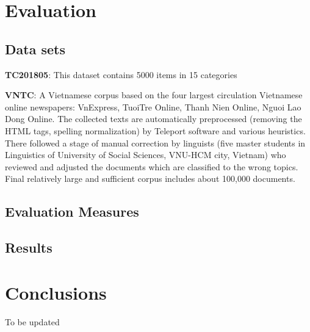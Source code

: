 \documentclass[11pt,a4paper]{article}
\begin{document}
\section{Evaluation}

\subsection{Data sets}

\noindent \textbf{TC201805}: This dataset contains 5000 items in 15 categories

\noindent \textbf{VNTC}: A Vietnamese corpus based on the four largest
circulation Vietnamese online newspapers: VnExpress, TuoiTre Online, Thanh Nien Online, Nguoi Lao Dong Online. The collected texts are automatically preprocessed (removing the HTML tags, spelling normalization) by Teleport software and various heuristics. There followed a stage of manual correction by linguists (five master students in Linguistics of University of Social Sciences, VNU-HCM city, Vietnam) who reviewed and adjusted the documents which are
classified to the wrong topics. Final relatively large and sufficient corpus includes about 100,000 documents.

\subsection{Evaluation Measures}

\subsection{Results}


\section{Conclusions}

To be updated



\end{document}
